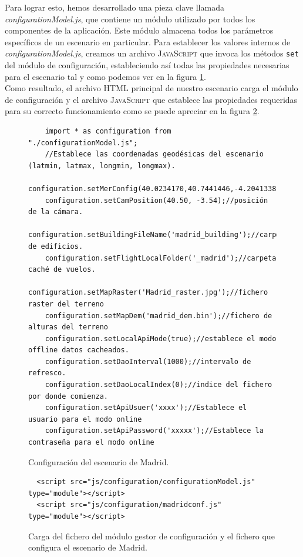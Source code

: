 \documentclass[a4paper, 11pt]{book}
\begin{document}
Para lograr esto, hemos desarrollado una pieza clave llamada \emph{configurationModel.js}, que contiene un módulo utilizado por todos los componentes de la aplicación. Este módulo almacena todos los parámetros específicos de un escenario en particular. Para establecer los valores internos de \emph{configurationModel.js}, creamos un archivo \textsc{JavaScript} que invoca los métodos \texttt{set} del módulo de configuración, estableciendo así todas las propiedades necesarias para el escenario tal y como podemos ver en la figura \ref{codigo:madridConf}.\\ 
Como resultado, el archivo \textsc{HTML} principal de nuestro escenario carga el módulo de configuración y el archivo \textsc{JavaScript} que establece las propiedades requeridas para su correcto funcionamiento como se puede apreciar en la figura \ref{codigo:cargaConfiguracion}.
\begin{figure}[h]
\centering
\begin{verbatim}
    import * as configuration from "./configurationModel.js";
    //Establece las coordenadas geodésicas del escenario (latmin, latmax, longmin, longmax).
    configuration.setMerConfig(40.0234170,40.7441446,-4.2041338,-3.2538165);
    configuration.setCamPosition(40.50, -3.54);//posición de la cámara.
    configuration.setBuildingFileName('madrid_building');//carpeta de edificios.
    configuration.setFlightLocalFolder('_madrid');//carpeta caché de vuelos.
    configuration.setMapRaster('Madrid_raster.jpg');//fichero raster del terreno
    configuration.setMapDem('madrid_dem.bin');//fichero de alturas del terreno
    configuration.setLocalApiMode(true);//establece el modo offline datos cacheados.
    configuration.setDaoInterval(1000);//intervalo de refresco.
    configuration.setDaoLocalIndex(0);//indice del fichero por donde comienza.
    configuration.setApiUsuer('xxxx');//Establece el usuario para el modo online
    configuration.setApiPassword('xxxxx');//Establece la contraseña para el modo online
\end{verbatim}
\caption{Configuración del escenario de Madrid.
\label{codigo:madridConf}}
\end{figure}
\begin{figure}[h]
\centering
\begin{verbatim}
  <script src="js/configuration/configurationModel.js" type="module"></script>
  <script src="js/configuration/madridconf.js" type="module"></script>
\end{verbatim}
\caption{Carga del fichero del módulo gestor de configuración y el fichero que configura el escenario de Madrid.
\label{codigo:cargaConfiguracion}}
\end{figure}
\end{document}
